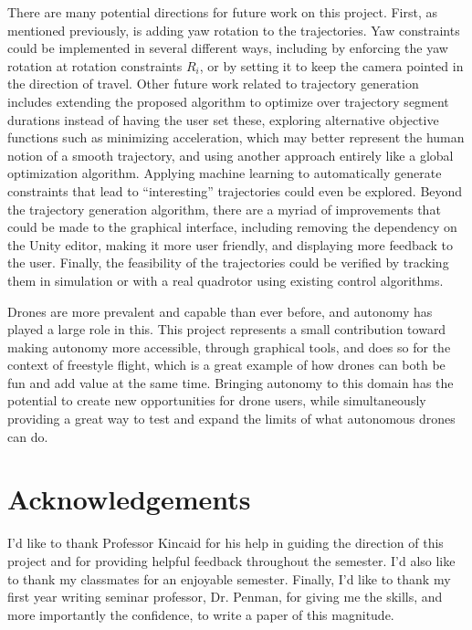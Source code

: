 \documentclass[pageno]{jpaper}
\newcommand{\quotes}[1]{``#1''}
\begin{document}
There are many potential directions for future work on this project. First, as mentioned previously, is adding yaw rotation to the trajectories. Yaw constraints could be implemented in several different ways, including by enforcing the yaw rotation at rotation constraints $R_i$, or by setting it to keep the camera pointed in the direction of travel. Other future work related to trajectory generation includes extending the proposed algorithm to optimize over trajectory segment durations instead of having the user set these, exploring alternative objective functions such as minimizing acceleration, which may better represent the human notion of a smooth trajectory, and using another approach entirely like a global optimization algorithm. Applying machine learning to automatically generate constraints that lead to \quotes{interesting} trajectories could even be explored. Beyond the trajectory generation algorithm, there are a myriad of improvements that could be made to the graphical interface, including removing the dependency on the Unity editor, making it more user friendly, and displaying more feedback to the user. Finally, the feasibility of the trajectories could be verified by tracking them in simulation or with a real quadrotor using existing control algorithms.

Drones are more prevalent and capable than ever before, and autonomy has played a large role in this. This project represents a small contribution toward making autonomy more accessible, through graphical tools, and does so for the context of freestyle flight, which is a great example of how drones can both be fun and add value at the same time. Bringing autonomy to this domain has the potential to create new opportunities for drone users, while simultaneously providing a great way to test and expand the limits of what autonomous drones can do.

\section{Acknowledgements}

I'd like to thank Professor Kincaid for his help in guiding the direction of this project and for providing helpful feedback throughout the semester. I'd also like to thank my classmates for an enjoyable semester. Finally, I'd like to thank my first year writing seminar professor, Dr. Penman, for giving me the skills, and more importantly the confidence, to write a paper of this magnitude.




\end{document}
